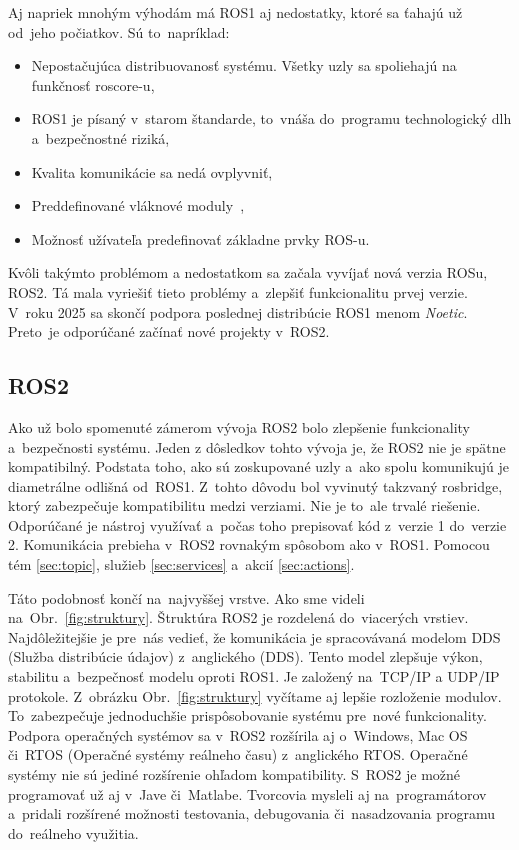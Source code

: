Aj napriek mnohým výhodám má ROS1 aj nedostatky, ktoré sa ťahajú už od~jeho počiatkov. Sú to~napríklad:

\begin{itemize}
	\item Nepostačujúca distribuovanosť systému. Všetky uzly sa spoliehajú na funkčnosť roscore-u,
	\item ROS1 je písaný v~starom štandarde, to~vnáša do~programu technologický dlh a~bezpečnostné riziká,
	\item Kvalita komunikácie sa nedá ovplyvniť,
	\item Preddefinované vláknové moduly~\cite{ROS2design},
	\item Možnosť užívateľa predefinovať základne prvky ROS-u.
\end{itemize}

Kvôli takýmto problémom a nedostatkom sa začala vyvíjať nová verzia ROSu, ROS2. Tá mala vyriešiť tieto problémy a~zlepšiť funkcionalitu
prvej verzie. V~roku 2025 sa skončí podpora poslednej distribúcie ROS1 menom \textit{Noetic}. Preto~je odporúčané začínať nové projekty
v~ROS2.

\subsection{ROS2}

Ako už bolo spomenuté zámerom vývoja ROS2 bolo zlepšenie funkcionality a~bezpečnosti systému. Jeden z dôsledkov tohto vývoja je, že ROS2
nie je spätne kompatibilný. Podstata toho, ako sú zoskupované uzly a~ako spolu komunikujú je diametrálne odlišná od~ROS1. Z~tohto dôvodu
bol vyvinutý takzvaný rosbridge, ktorý zabezpečuje kompatibilitu medzi verziami. Nie je to~ale trvalé riešenie. Odporúčané je nástroj
využívať a~počas toho prepisovať kód z~verzie 1 do~verzie 2. Komunikácia prebieha v~ROS2 rovnakým spôsobom ako v~ROS1. Pomocou tém
\ref{sec:topic}, služieb \ref{sec:services} a~akcií \ref{sec:actions}.

Táto podobnosť končí na~najvyššej vrstve. Ako sme videli na~Obr.~\ref{fig:struktury}. Štruktúra ROS2 je rozdelená do~viacerých vrstiev.
Najdôležitejšie je pre~nás vedieť, že komunikácia je spracovávaná modelom DDS (Služba distribúcie údajov) z~anglického (\acrlong{DDS}). Tento
model zlepšuje výkon, stabilitu a~bezpečnosť modelu oproti ROS1. Je založený na~TCP/IP a UDP/IP protokole. Z~obrázku Obr.~\ref{fig:struktury}
vyčítame aj lepšie rozloženie modulov. To~zabezpečuje jednoduchšie prispôsobovanie systému pre~nové funkcionality. Podpora operačných systémov
sa v~ROS2 rozšírila aj o~Windows, Mac OS či~RTOS (Operačné systémy reálneho času) z~anglického \acrlong{RTOS}. Operačné systémy nie sú jediné
rozšírenie ohľadom kompatibility. S~ROS2 je možné programovať už aj v~Jave či~Matlabe. Tvorcovia mysleli aj na~programátorov a~pridali rozšírené
možnosti testovania, debugovania či~nasadzovania programu do~reálneho využitia.

